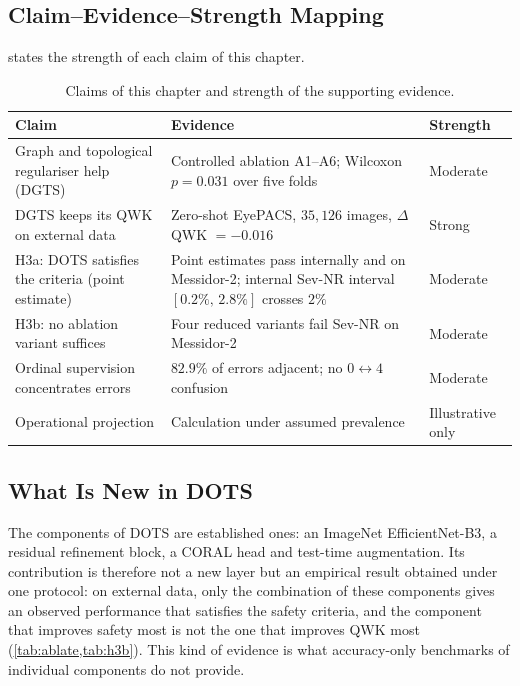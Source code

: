 \subsection{Claim--Evidence--Strength Mapping}

 states the strength of each claim of this chapter.

\begin{table}[H]
\centering
\caption[Claims of Chapter 5 and strength of evidence]{Claims of this chapter and
strength of the supporting evidence.}
\label{tab:claims}
\small
\begin{tabular}{@{}P{4.4cm}P{7.6cm}l@{}}
\toprule
Claim & Evidence & Strength \\
\midrule
Graph and topological regulariser help (DGTS) & Controlled ablation A1--A6; Wilcoxon $p=0.031$ over five folds & Moderate \\
DGTS keeps its QWK on external data & Zero-shot EyePACS, $35{,}126$ images, $\Delta$QWK $=-0.016$ & Strong \\
H3a: DOTS satisfies the criteria (point estimate) & Point estimates pass internally and on Messidor-2; internal Sev-NR interval $[0.2\%,\,2.8\%]$ crosses $2\%$ & Moderate \\
H3b: no ablation variant suffices & Four reduced variants fail Sev-NR on Messidor-2 & Moderate \\
Ordinal supervision concentrates errors & $82.9\%$ of errors adjacent; no $0\leftrightarrow4$ confusion & Moderate \\
Operational projection & Calculation under assumed prevalence & Illustrative only \\
\bottomrule
\end{tabular}
\end{table}

\subsection{What Is New in DOTS}
\label{sec:dots-new}
The components of DOTS are established ones: an ImageNet EfficientNet-B3, a residual
refinement block, a CORAL head and test-time augmentation. Its contribution is therefore
not a new layer but an empirical result obtained under one protocol: on external data,
only the combination of these components gives an observed performance that satisfies
the safety criteria, and the component
that improves safety most is not the one that improves QWK most (\cref{tab:ablate,tab:h3b}).
This kind of evidence is what accuracy-only benchmarks of individual components do not
provide.

